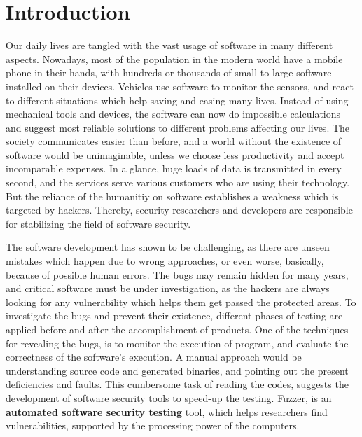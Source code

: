 \section{Introduction}
\label{sec:intro}


Our daily lives are tangled with the vast usage of software in many different aspects. Nowadays, most of the population in the modern world have a mobile phone in their hands, with hundreds or thousands of small to large software installed on their devices. Vehicles use software to monitor the sensors, and react to different situations which help saving and easing many lives. Instead of using mechanical tools and devices, the software can now do impossible calculations and suggest most reliable solutions to different problems affecting our lives. The society communicates easier than before, and a world without the existence of software would be unimaginable, unless we choose less productivity and accept incomparable expenses. In a glance, huge loads of data is transmitted in every second, and the services serve various customers who are using their technology. But the reliance of the humanitiy on software establishes a weakness which is targeted by hackers. Thereby, security researchers and developers are responsible for stabilizing the field of software security.


The software development has shown to be challenging, as there are unseen mistakes which happen due to wrong approaches, or even worse, basically, because of possible human  errors. The bugs may remain hidden for many years, and critical software must be under investigation, as the hackers are always looking for any vulnerability which helps them get passed the protected areas. To investigate the bugs and prevent their existence, different phases of testing are applied before and after the accomplishment of products. One of the techniques for revealing the bugs, is to monitor the execution of program, and evaluate the correctness of the software's execution. A manual approach would be understanding source code and generated binaries, and pointing out the present deficiencies and faults. This cumbersome task of reading the codes, suggests the development of software security tools to speed-up the testing. Fuzzer, is an \textbf{automated software security testing} tool, which helps researchers find vulnerabilities, supported by the processing power of the computers.